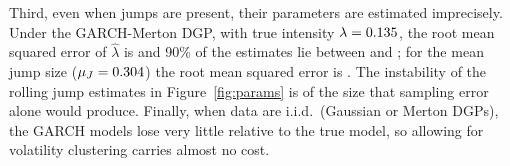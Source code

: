 Third, even when jumps are present, their parameters are estimated imprecisely. Under the GARCH-Merton DGP, with true intensity $\lambda=0.135$, the root mean squared error of $\hat\lambda$ is \mcRmseLambda{} and 90\% of the estimates lie between \mcLoLambda{} and \mcHiLambda; for the mean jump size ($\mu_J=0.304$) the root mean squared error is \mcRmseMuj. The instability of the rolling jump estimates in Figure~\ref{fig:params} is of the size that sampling error alone would produce. Finally, when data are i.i.d.\ (Gaussian or Merton DGPs), the GARCH models lose very little relative to the true model, so allowing for volatility clustering carries almost no cost.
